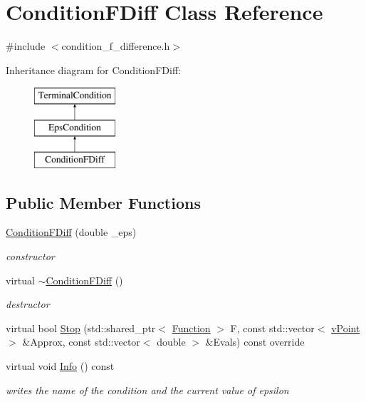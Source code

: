\hypertarget{class_condition_f_diff}{}\section{Condition\+F\+Diff Class Reference}
\label{class_condition_f_diff}


{\ttfamily \#include $<$condition\+\_\+f\+\_\+difference.\+h$>$}

Inheritance diagram for Condition\+F\+Diff\+:\begin{figure}[H]
\begin{center}
\leavevmode
\includegraphics[height=3.000000cm]{class_condition_f_diff}
\end{center}
\end{figure}
\subsection*{Public Member Functions}
\begin{DoxyCompactItemize}
\item 
\mbox{\label{class_condition_f_diff_af123e2b22ecad36fe88f3eba2a9ec3b6}} 
\hyperlink{class_condition_f_diff_af123e2b22ecad36fe88f3eba2a9ec3b6}{Condition\+F\+Diff} (double \+\_\+eps)
\begin{DoxyCompactList}\small\item\em constructor \end{DoxyCompactList}\item 
\mbox{\label{class_condition_f_diff_aebe3f77b561340000aebf0c97bd71144}} 
virtual \hyperlink{class_condition_f_diff_aebe3f77b561340000aebf0c97bd71144}{$\sim$\+Condition\+F\+Diff} ()
\begin{DoxyCompactList}\small\item\em destructor \end{DoxyCompactList}\item 
virtual bool \hyperlink{class_condition_f_diff_a31b06f62d08ab7c2ec1b011148889aab}{Stop} (std\+::shared\+\_\+ptr$<$ \hyperlink{class_function}{Function} $>$ F, const std\+::vector$<$ \hyperlink{classv_point}{v\+Point} $>$ \&Approx, const std\+::vector$<$ double $>$ \&Evals) const override
\item 
\mbox{\label{class_condition_f_diff_af632ec588748eeb234bd1df7e95f74ea}} 
virtual void \hyperlink{class_condition_f_diff_af632ec588748eeb234bd1df7e95f74ea}{Info} () const
\begin{DoxyCompactList}\small\item\em writes the name of the condition and the current value of epsilon \end{DoxyCompactList}\end{DoxyCompactItemize}
